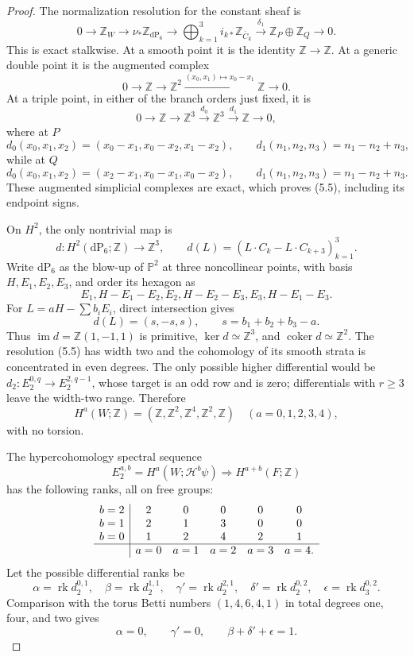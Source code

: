 \begin{proof}
The normalization resolution for the constant sheaf is
\[
0\longrightarrow\mathbb Z_W
\longrightarrow\nu_*\mathbb Z_{\mathrm{dP}_6}
\longrightarrow\bigoplus_{k=1}^3 i_{k*}\mathbb Z_{\bar C_k}
\xrightarrow{\delta_1}\mathbb Z_P\oplus\mathbb Z_Q
\longrightarrow0.
\tag{5.5}
\]
This is exact stalkwise.  At a smooth point it is the identity
\(\mathbb Z\to\mathbb Z\).  At a generic double point it is the augmented
complex
\[
 0\longrightarrow\mathbb Z\longrightarrow\mathbb Z^2
 \xrightarrow{(x_0,x_1)\mapsto x_0-x_1}\mathbb Z\longrightarrow0.
\]
At a triple point, in either of the branch orders just fixed, it is
\[
 0\longrightarrow\mathbb Z\longrightarrow\mathbb Z^3
 \xrightarrow{d_0}\mathbb Z^3
 \xrightarrow{d_1}\mathbb Z\longrightarrow0,
\]
where at \(P\)
\[
 d_0(x_0,x_1,x_2)=(x_0-x_1,x_0-x_2,x_1-x_2),
 \qquad d_1(n_1,n_2,n_3)=n_1-n_2+n_3,
\]
while at \(Q\)
\[
 d_0(x_0,x_1,x_2)=(x_2-x_1,x_0-x_1,x_0-x_2),
 \qquad d_1(n_1,n_2,n_3)=n_1-n_2+n_3.
\]
These augmented simplicial complexes are exact, which proves (5.5),
including its endpoint signs.

On \(H^2\), the only nontrivial map is
\[
 d:H^2(\mathrm{dP}_6;\mathbb Z)\longrightarrow\mathbb Z^3,
 \qquad
 d(L)=(L\cdot C_k-L\cdot C_{k+3})_{k=1}^3.
\]
Write \(\mathrm{dP}_6\) as the blow-up of \(\mathbb P^2\) at three
noncollinear points, with basis \(H,E_1,E_2,E_3\), and order its hexagon as
\[
 E_1, H-E_1-E_2, E_2, H-E_2-E_3, E_3, H-E_1-E_3.
\]
For \(L=aH-\sum b_iE_i\), direct intersection gives
\[
 d(L)=(s,-s,s),\qquad s=b_1+b_2+b_3-a.
\tag{5.6}
\]
Thus \(\operatorname{im}d=\mathbb Z(1,-1,1)\) is primitive,
\(\ker d\simeq\mathbb Z^3\), and
\(\operatorname{coker}d\simeq\mathbb Z^2\).  The resolution (5.5) has
width two and the cohomology of its smooth strata is concentrated in even
degrees.  The only possible higher differential would be
\(d_2:E_2^{0,q}\to E_2^{2,q-1}\), whose target is an odd row and is zero;
differentials with \(r\ge3\) leave the width-two range.  Therefore
\[
 H^a(W;\mathbb Z)=
 (\mathbb Z,\mathbb Z^2,\mathbb Z^4,\mathbb Z^2,\mathbb Z)
 \quad(a=0,1,2,3,4),
\tag{5.7}
\]
with no torsion.

The hypercohomology spectral sequence
\[
 E_2^{a,b}=H^a(W;\mathcal H^b\psi)
 \Longrightarrow H^{a+b}(F;\mathbb Z)
\tag{5.8}
\]
has the following ranks, all on free groups:
\[
\begin{array}{c|ccccc}
b=2&2&0&0&0&0\\
b=1&2&1&3&0&0\\
b=0&1&2&4&2&1\\ \hline
&a=0&a=1&a=2&a=3&a=4.
\end{array}
\]
Let the possible differential ranks be
\[
\alpha=\operatorname{rk}d_2^{0,1},\quad
\beta=\operatorname{rk}d_2^{1,1},\quad
\gamma'=\operatorname{rk}d_2^{2,1},\quad
\delta'=\operatorname{rk}d_2^{0,2},\quad
\epsilon=\operatorname{rk}d_3^{0,2}.
\]
Comparison with the torus Betti numbers \((1,4,6,4,1)\) in total degrees
one, four, and two gives
\[
 \alpha=0,\qquad \gamma'=0,\qquad
 \beta+\delta'+\epsilon=1.
\tag{5.9}
\]


\end{proof}
